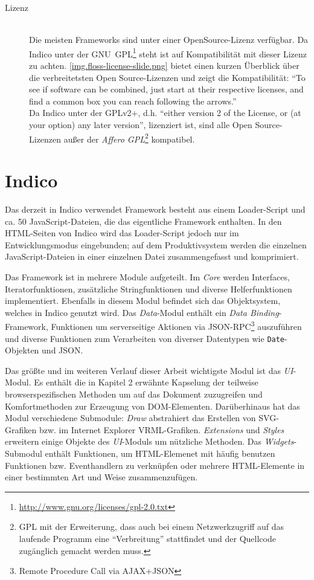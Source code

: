 \begin{description}
\item[Lizenz] \hfill \\
Die meisten Frameworks sind unter einer OpenSource-Lizenz verfügbar.
Da Indico unter der
GNU~GPL\footnote{\href{http://www.gnu.org/licenses/gpl-2.0.txt}{http://www.gnu.org/licenses/gpl-2.0.txt}}
steht ist auf Kompatibilität mit dieser Lizenz zu achten. \autoref{img.floss-license-slide.png}
bietet einen kurzen Überblick über die verbreitetsten Open Source-Lizenzen und zeigt die
Kompatibilität: \enquote{To see if software can be combined, just start at their respective
licenses, and find a common box you can reach following the arrows.} \citep{osslic} \\
Da Indico unter der GPLv2+, d.h. \enquote{either version 2 of the License, or (at your option) any
later version}, lizenziert ist, sind alle Open Source-Lizenzen außer der \emph{Affero
GPL}\footnote{GPL mit der Erweiterung, dass auch bei einem Netzwerkzugriff auf das laufende Programm
eine \enquote{Verbreitung} stattfindet und der Quellcode zugänglich gemacht werden muss.}
kompatibel.
\end{description}



\section{Indico}
Das derzeit in Indico verwendet Framework besteht aus einem Loader-Script und ca. 50
JavaScript-Dateien, die das eigentliche Framework enthalten. In den HTML-Seiten von Indico wird das
Loader-Script jedoch nur im Entwicklungsmodus eingebunden; auf dem Produktivsystem werden die
einzelnen JavaScript-Dateien in einer einzelnen Datei zusammengefasst und komprimiert.

Das Framework ist in mehrere Module aufgeteilt. Im \emph{Core} werden Interfaces,
Iteratorfunktionen, zusätzliche Stringfunktionen und diverse Helferfunktionen implementiert.
Ebenfalls in diesem Modul befindet sich das Objektsystem, welches in Indico genutzt wird.
Das \emph{Data}-Modul enthält ein \emph{Data Binding}-Framework, Funktionen um serverseitige
Aktionen via JSON-RPC\footnote{Remote Procedure Call via AJAX+JSON} auszuführen und diverse
Funktionen zum Verarbeiten von diverser Datentypen wie \lstinline{Date}-Objekten und JSON.

Das größte und im weiteren Verlauf dieser Arbeit wichtigste Modul ist das \emph{UI}-Modul.
Es enthält die in Kapitel 2 erwähnte Kapselung der teilweise browserspezifischen Methoden um auf das
Dokument zuzugreifen und Komfortmethoden zur Erzeugung von DOM-Elementen. Darüberhinaus hat das
Modul verschiedene Submodule: \emph{Draw} abstrahiert das Erstellen von SVG-Grafiken bzw. im
Internet Explorer VRML-Grafiken. \emph{Extensions} und \emph{Styles} erweitern einige Objekte des
\emph{UI}-Moduls um nützliche Methoden. Das \emph{Widgets}-Submodul enthält Funktionen, um
HTML-Elemenet mit häufig benutzen Funktionen bzw. Eventhandlern zu verknüpfen oder mehrere
HTML-Elemente in einer bestimmten Art und Weise zusammenzufügen.

